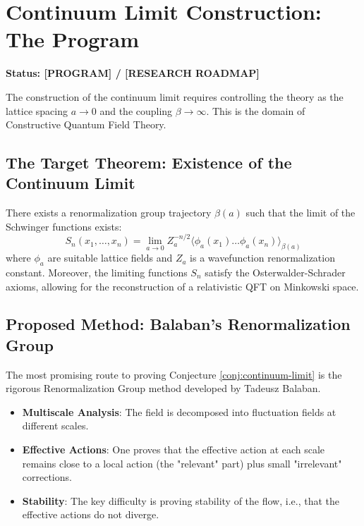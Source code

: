 \section{Continuum Limit Construction: The Program}
\label{sec:continuum-program}

\textbf{Status: [PROGRAM] / [RESEARCH ROADMAP]}

The construction of the continuum limit requires controlling the theory as the lattice spacing $a \to 0$ and the coupling $\beta \to \infty$. This is the domain of Constructive Quantum Field Theory.

\subsection{The Target Theorem: Existence of the Continuum Limit}

\begin{conjecture}
\label{conj:continuum-limit}
There exists a renormalization group trajectory $\beta(a)$ such that the limit of the Schwinger functions exists:
\[
S_n(x_1, \dots, x_n) = \lim_{a \to 0} Z_a^{-n/2} \langle \phi_a(x_1) \dots \phi_a(x_n) \rangle_{\beta(a)}
\]
where $\phi_a$ are suitable lattice fields and $Z_a$ is a wavefunction renormalization constant.
Moreover, the limiting functions $S_n$ satisfy the Osterwalder-Schrader axioms, allowing for the reconstruction of a relativistic QFT on Minkowski space.
\end{conjecture}

\subsection{Proposed Method: Balaban's Renormalization Group}

The most promising route to proving Conjecture \ref{conj:continuum-limit} is the rigorous Renormalization Group method developed by Tadeusz Balaban.

\begin{itemize}
    \item \textbf{Multiscale Analysis}: The field is decomposed into fluctuation fields at different scales.
    \item \textbf{Effective Actions}: One proves that the effective action at each scale remains close to a local action (the "relevant" part) plus small "irrelevant" corrections.
    \item \textbf{Stability}: The key difficulty is proving stability of the flow, i.e., that the effective actions do not diverge.
\end{itemize}


